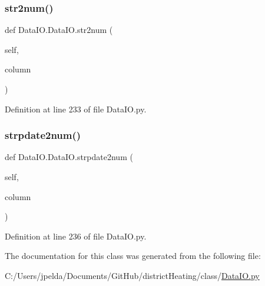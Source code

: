 \subsubsection{\texorpdfstring{str2num()}{str2num()}}
{\footnotesize\ttfamily def Data\+I\+O.\+Data\+I\+O.\+str2num (\begin{DoxyParamCaption}\item[{}]{self,  }\item[{}]{column }\end{DoxyParamCaption})}



Definition at line 233 of file Data\+I\+O.\+py.

\mbox{\label{class_data_i_o_1_1_data_i_o_a14e038023e1dd43e8c0a18842b4b73fb}} 
\subsubsection{\texorpdfstring{strpdate2num()}{strpdate2num()}}
{\footnotesize\ttfamily def Data\+I\+O.\+Data\+I\+O.\+strpdate2num (\begin{DoxyParamCaption}\item[{}]{self,  }\item[{}]{column }\end{DoxyParamCaption})}



Definition at line 236 of file Data\+I\+O.\+py.



The documentation for this class was generated from the following file\+:\begin{DoxyCompactItemize}
\item 
C\+:/\+Users/jpelda/\+Documents/\+Git\+Hub/district\+Heating/class/\hyperlink{_data_i_o_8py}{Data\+I\+O.\+py}\end{DoxyCompactItemize}
